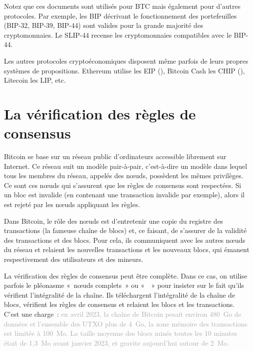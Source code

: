Notez que ces documents sont utilisés pour BTC mais également pour d'autres protocoles. Par exemple, les BIP décrivant le fonctionnement des portefeuilles (BIP-32, BIP-39, BIP-44) sont valides pour la grande majorité des cryptomonnaies. Le SLIP-44 recense les cryptomonnaies compatibles avec le BIP-44.

Les autres protocoles cryptoéconomiques disposent même parfois de leurs propres systèmes de propositions. Ethereum utilise les EIP (), Bitcoin Cash les CHIP (), Litecoin les LIP, etc.

\section*{La vérification des règles de consensus}

Bitcoin se base sur un réseau public d'ordinateurs accessible librement sur Internet. Ce réseau suit un modèle pair-à-pair, c'est-à-dire un modèle dans lequel tous les membres du réseau, appelés des nœuds, possèdent les mêmes privilèges. Ce sont ces nœuds qui s'assurent que les règles de consensus sont respectées. Si un bloc est invalide (en contenant une transaction invalide par exemple), alors il est rejeté par les nœuds appliquant les règles.

Dans Bitcoin, le rôle des nœuds est d'entretenir une copie du registre des transactions (la fameuse chaîne de blocs) et, ce faisant, de s'assurer de la validité des transactions et des blocs. Pour cela, ils communiquent avec les autres nœuds du réseau et relaient les nouvelles transactions et les nouveaux blocs, qui émanent respectivement des utilisateurs et des mineurs.

La vérification des règles de consensus peut être complète. Dans ce cas, on utilise parfois le pléonasme «~nœuds complets~» ou «~~» pour insister sur le fait qu'ils vérifient l'intégralité de la chaîne. Ils téléchargent l'intégralité de la chaîne de blocs, vérifient les règles de consensus et relaient les blocs et les transactions. C'est une charge~: \textcolor{darkgray}{en avril 2023, la chaîne de Bitcoin pesait environ 480~Go de données et l'ensemble des UTXO plus de 4~Go, la zone mémoire des transactions est limitée à 100~Mo. La taille moyenne des blocs minés toutes les 10 minutes était de 1,3~Mo avant janvier 2023, et gravite aujourd'hui autour de 2~Mo.}

